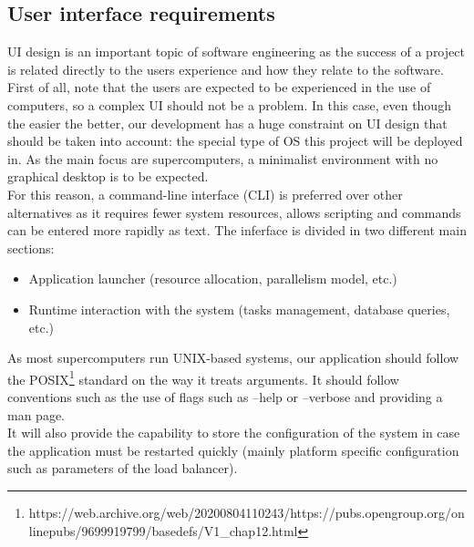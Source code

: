 \subsection{User interface requirements}

UI design is an important topic of software engineering as the success of a
project is related directly to the users experience and how they relate to the
software.\\

First of all, note that the users are expected to be experienced in the use of
computers, so a complex UI should not be a problem. In this case, even though
the easier the better, our development has a huge constraint on UI design that
should be taken into account: the special type of OS this project
will be deployed in. As the main focus are supercomputers, a minimalist environment
with no graphical desktop is to be expected.\\

For this reason, a command-line interface (CLI) is preferred over other alternatives as it requires fewer system resources, allows scripting and commands can be entered more rapidly as text.
The inferface is divided in two different  main sections:\\
\begin{itemize}
  \item Application launcher (resource allocation, parallelism model, etc.)
  \item Runtime interaction with the system (tasks management, database
  queries, etc.)
\end{itemize}

As most supercomputers run UNIX-based systems, our application should follow
the POSIX\footnote{https://web.archive.org/web/20200804110243/https://pubs.opengroup.org/onlinepubs/9699919799/basedefs/V1_chap12.html} standard on the way it treats arguments.
It should follow conventions such as the use of flags such as --help or
--verbose and providing a man page.\\

It will also provide the capability to store the configuration of the system in case
the application must be restarted quickly (mainly platform specific
configuration such as parameters of the load balancer). \\
